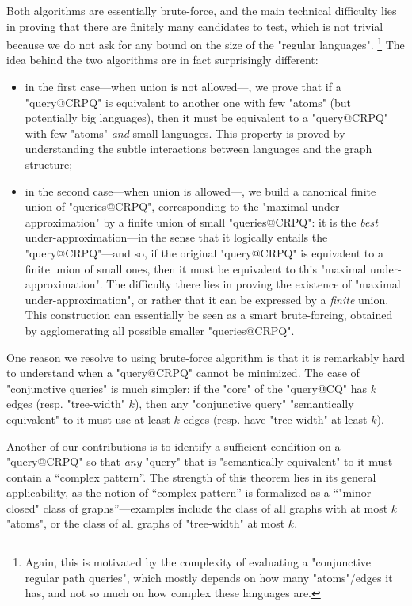 Both algorithms are essentially brute-force, and the main technical difficulty
lies in proving that there are finitely many candidates to test, which is not
trivial because we do not ask for any bound on the size of the "regular languages".%
\footnote{Again, this is motivated by the complexity of evaluating
a "conjunctive regular path queries", which mostly depends on how many "atoms"/edges it has,
and not so much on how complex these languages are.}
The idea behind the two algorithms are in fact surprisingly different:
\begin{itemize}
	\item in the first case---when union is not allowed---, we prove that
		if a "query@CRPQ" is equivalent to another one with few
		"atoms" (but potentially big languages), then it must be
		equivalent to a "query@CRPQ" with few "atoms" \emph{and} small languages.
		This property is proved by understanding the subtle interactions between
		languages and the graph structure;
	\item in the second case---when union is allowed---, we build a canonical
		finite union of "queries@CRPQ", corresponding to the
		"maximal under-approximation" by a finite union of small "queries@CRPQ": 
		it is the \emph{best} under-approximation---in the sense that
		it logically entails the "query@CRPQ"---and so, if the original
		"query@CRPQ" is equivalent to a finite union of small ones, then
		it must be equivalent to this "maximal under-approximation".
		The difficulty there lies in proving the existence of "maximal under-approximation",
		or rather that it can be expressed by a \emph{finite} union.
		This construction can essentially be seen as a
		smart brute-forcing, obtained by agglomerating all possible smaller "queries@CRPQ".
\end{itemize}

One reason we resolve to using brute-force algorithm is that it is
remarkably hard to understand when a "query@CRPQ" cannot be minimized.
The case of "conjunctive queries" is much simpler: if the "core" 
of the "query@CQ" has $k$ edges (resp. "tree-width" $k$),
then any "conjunctive query" "semantically equivalent" to it must use at least $k$ edges
(resp. have "tree-width" at least $k$).

Another of our contributions is to identify a sufficient condition
on a "query@CRPQ" so that \emph{any} "query" that is "semantically equivalent" to it
must contain a ``complex pattern''. The strength of this theorem lies in its
general applicability, as the notion of ``complex pattern''
is formalized as a ``"minor-closed" class
of graphs''---examples include the class of all graphs with at most $k$ "atoms",
or the class of all graphs of "tree-width" at most $k$.


